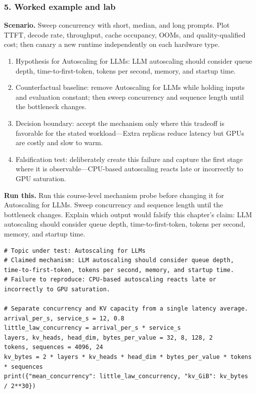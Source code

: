 \subsubsection*{5. Worked example and lab}
\textbf{Scenario.} Sweep concurrency with short, median, and long prompts. Plot TTFT, decode rate, throughput, cache occupancy, OOMs, and quality-qualified cost; then canary a new runtime independently on each hardware type.
\begin{enumerate}
\item Hypothesis for Autoscaling for LLMs: LLM autoscaling should consider queue depth, time-to-first-token, tokens per second, memory, and startup time.
\item Counterfactual baseline: remove Autoscaling for LLMs while holding inputs and evaluation constant; then sweep concurrency and sequence length until the bottleneck changes.
\item Decision boundary: accept the mechanism only where this tradeoff is favorable for the stated workload—Extra replicas reduce latency but GPUs are costly and slow to warm.
\item Falsification test: deliberately create this failure and capture the first stage where it is observable—CPU-based autoscaling reacts late or incorrectly to GPU saturation.
\end{enumerate}
\textbf{Run this.} Run this course-level mechanism probe before changing it for Autoscaling for LLMs. Sweep concurrency and sequence length until the bottleneck changes. Explain which output would falsify this chapter's claim: LLM autoscaling should consider queue depth, time-to-first-token, tokens per second, memory, and startup time.
\begin{Verbatim}[fontsize=\scriptsize]
# Topic under test: Autoscaling for LLMs
# Claimed mechanism: LLM autoscaling should consider queue depth, time-to-first-token, tokens per second, memory, and startup time.
# Failure to reproduce: CPU-based autoscaling reacts late or incorrectly to GPU saturation.

# Separate concurrency and KV capacity from a single latency average.
arrival_per_s, service_s = 12, 0.8
little_law_concurrency = arrival_per_s * service_s
layers, kv_heads, head_dim, bytes_per_value = 32, 8, 128, 2
tokens, sequences = 4096, 24
kv_bytes = 2 * layers * kv_heads * head_dim * bytes_per_value * tokens * sequences
print({"mean_concurrency": little_law_concurrency, "kv_GiB": kv_bytes / 2**30})
\end{Verbatim}
